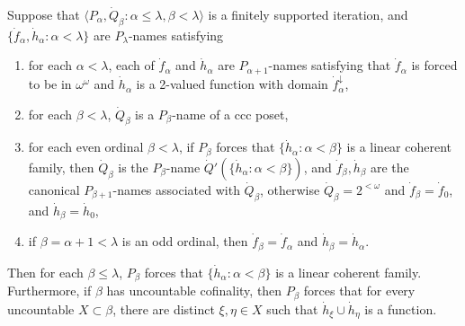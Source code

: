 \documentclass[10pt,a4paper]{amsart}
\begin{document}
\begin{lemma}  Suppose that $\langle P_\alpha, \dot Q_\beta : \alpha \leq \lambda,
\beta <\lambda\rangle$ is a finitely\label{cohere} supported iteration,
and $\{ \dot f_\alpha , \dot h_\alpha : \alpha < \lambda \}$ are
 $P_\lambda$-names 
satisfying
\begin{enumerate}
\item for each $\alpha<\lambda$, each of $\dot f_\alpha$ and 
 $\dot h_\alpha$ are $P_{\alpha+1}$-names  satisfying that $\dot f_\alpha$
 is forced to be in $\omega^\omega$ and $\dot h_\alpha$ is a 2-valued
 function with domain $\dot f_\alpha^\downarrow$,
\item for each $\beta<\lambda$, $\dot Q_\beta$ is a $P_\beta$-name of a ccc poset,
\item for each even ordinal $\beta<\lambda$, if $P_\beta$ forces
that $\{ \dot h_\alpha : \alpha < \beta \}$ 
is a linear coherent family, then $\dot Q_\beta$ is 
the $P_\beta$-name  $\dot Q'(\{\dot h_\alpha : \alpha <\beta \})$,
and $\dot f_\beta, \dot h_\beta$ are the canonical $P_{\beta+1}$-names
 associated with $\dot Q_\beta$, otherwise $\dot Q_\beta = 2^{<\omega}$ and
 $\dot f_\beta=\dot f_0$,
 and $\dot h_\beta = \dot h_0$,
 \item if $\beta=\alpha+1<\lambda$ is an odd ordinal, then $\dot f_\beta=\dot f_\alpha$
 and $\dot h_\beta = \dot h_\alpha$.
 \end{enumerate}
Then for each $\beta \leq \lambda$, $P_\beta$ forces
that $\{ \dot h_\alpha : \alpha < \beta \}$ is
a linear coherent family. Furthermore, if $\beta$ has uncountable cofinality,
 then $P_\beta$ forces that for every uncountable $X\subset \beta$,
  there are distinct $\xi,\eta\in X$ such that
   $\dot h_\xi\cup \dot h_\eta$ is a function.
\end{lemma}
\end{document}
